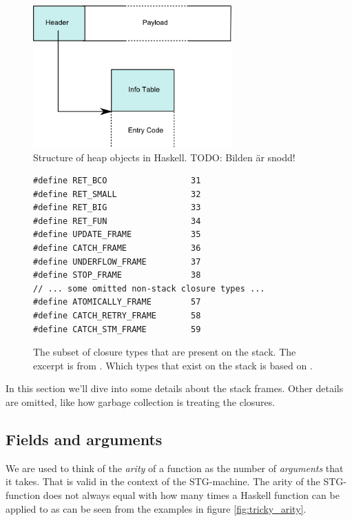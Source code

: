\begin{figure}
  \centering
  \includegraphics[width=3.0in]{fig/heap-object}
  \caption{Structure of heap objects in Haskell. TODO: Bilden är snodd!}
  \label{fig:heap_object}
\end{figure}

\begin{figure}
\begin{mdframed}
  \begin{verbatim}
#define RET_BCO                 31
#define RET_SMALL               32
#define RET_BIG                 33
#define RET_FUN                 34
#define UPDATE_FRAME            35
#define CATCH_FRAME             36
#define UNDERFLOW_FRAME         37
#define STOP_FRAME              38
// ... some omitted non-stack closure types ...
#define ATOMICALLY_FRAME        57
#define CATCH_RETRY_FRAME       58
#define CATCH_STM_FRAME         59
  \end{verbatim}
  \caption{The subset of closure types that are present on the stack.
The excerpt is from \cite{github_closure_types}. Which types that exist
on the stack is based on \cite{github_scavenge_stack}.}
  \label{fig:stack_types}
\end{mdframed}
\end{figure}


In this section we'll dive into
some details about the stack frames. Other details
are omitted, like how garbage collection is treating the closures.

\subsection{Fields and arguments}

We are used to think of the \emph{arity} of a function as the number
of \emph{arguments} that it takes. That is valid in the context
of the STG-machine. The arity of the STG-function does not always
equal with how many times a Haskell function can be applied to as
can be seen from the examples in figure \ref{fig:tricky_arity}.
\cite{commentary_function_calls}


